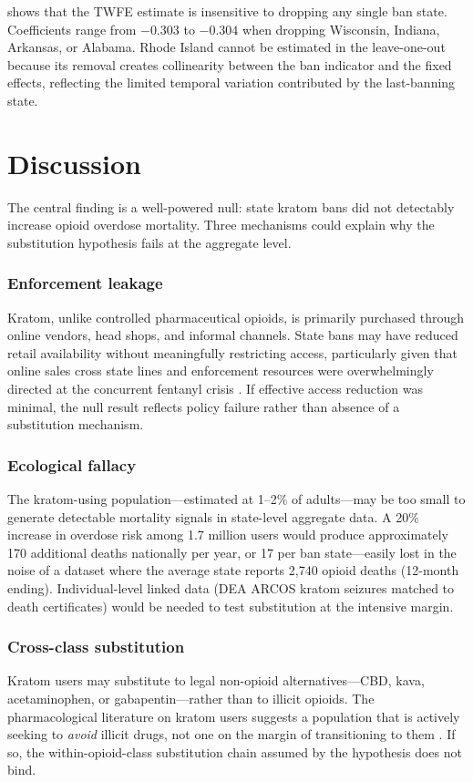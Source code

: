 \documentclass[12pt]{article}
\begin{document}
 shows that the TWFE estimate is insensitive to dropping any single ban state. Coefficients range from $-0.303$ to $-0.304$ when dropping Wisconsin, Indiana, Arkansas, or Alabama. Rhode Island cannot be estimated in the leave-one-out because its removal creates collinearity between the ban indicator and the fixed effects, reflecting the limited temporal variation contributed by the last-banning state.


\section{Discussion}

The central finding is a well-powered null: state kratom bans did not detectably increase opioid overdose mortality. Three mechanisms could explain why the substitution hypothesis fails at the aggregate level.

\subsubsection*{Enforcement leakage} Kratom, unlike controlled pharmaceutical opioids, is primarily purchased through online vendors, head shops, and informal channels. State bans may have reduced retail availability without meaningfully restricting access, particularly given that online sales cross state lines and enforcement resources were overwhelmingly directed at the concurrent fentanyl crisis \citep{henningfield2022challenge}. If effective access reduction was minimal, the null result reflects policy failure rather than absence of a substitution mechanism.

\subsubsection*{Ecological fallacy} The kratom-using population---estimated at 1--2\% of adults---may be too small to generate detectable mortality signals in state-level aggregate data. A 20\% increase in overdose risk among 1.7 million users would produce approximately 170 additional deaths nationally per year, or 17 per ban state---easily lost in the noise of a dataset where the average state reports 2,740 opioid deaths (12-month ending). Individual-level linked data (DEA ARCOS kratom seizures matched to death certificates) would be needed to test substitution at the intensive margin.

\subsubsection*{Cross-class substitution} Kratom users may substitute to legal non-opioid alternatives---CBD, kava, acetaminophen, or gabapentin---rather than to illicit opioids. The pharmacological literature on kratom users suggests a population that is actively seeking to \emph{avoid} illicit drugs, not one on the margin of transitioning to them \citep{grundmann2017patterns, smith2021self}. If so, the within-opioid-class substitution chain assumed by the hypothesis does not bind.
\end{document}
